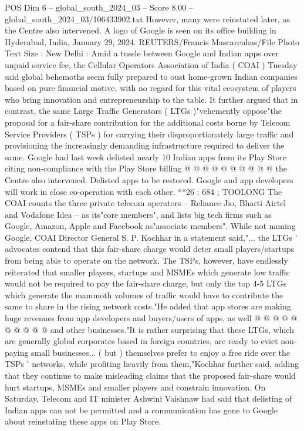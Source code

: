 \begin{textsample}{POS Dim 6 – global\_south\_2024\_03 – Score 8.00 – global\_south\_2024\_03/106433902.txt}
However, many were reinstated later, as the Centre also intervened.
A logo of Google is seen on its office building in Hyderabad, India, January 29, 2024.
REUTERS/Francis Mascarenhas/File Photo Text Size : New Delhi : Amid a tussle between Google and Indian apps over unpaid service fee, the Cellular Operators Association of India ( COAI ) Tuesday said global behemoths seem fully prepared to oust home-grown Indian companies based on pure financial motive, with no regard for this vital ecosystem of players who bring innovation and entrepreneurship to the table.
It further argued that in contrast, the same Large Traffic Generators ( LTGs )"vehemently oppose"the proposal for a fair-share contribution for the additional costs borne by Telecom Service Providers ( TSPs ) for carrying their disproportionately large traffic and provisioning the increasingly demanding infrastructure required to deliver the same.
Google had last week delisted nearly 10 Indian apps from its Play Store citing non-compliance with the Play Store billing @ @ @ @ @ @ @ @ @ @ the Centre also intervened.
Delisted apps to be restored.
Google and app developers will work in close co-operation with each other. **26 ; 684 ; TOOLONG The COAI counts the three private telecom operators -- Reliance Jio, Bharti Airtel and Vodafone Idea -- as its"core members", and lists big tech firms such as Google, Amazon, Apple and Facebook as"associate members".
While not naming Google, COAI Director General S.
P.
Kochhar in a statement said,"... the LTGs ' advocates contend that this fair-share charge would deter small players/startups from being able to operate on the network.
The TSPs, however, have endlessly reiterated that smaller players, startups and MSMEs which generate low traffic would not be required to pay the fair-share charge, but only the top 4-5 LTGs which generate the mammoth volumes of traffic would have to contribute the same to share in the rising network costs."He added that app stores are making huge revenues from app developers and buyers/users of apps, as well @ @ @ @ @ @ @ @ @ @ and other businesses."It is rather surprising that these LTGs, which are generally global corporates based in foreign countries, are ready to evict non-paying small businesses... ( but ) themselves prefer to enjoy a free ride over the TSPs ' networks, while profiting heavily from them,"Kochhar further said, adding that they continue to make misleading claims that the proposed fair-share would hurt startups, MSMEs and smaller players and constrain innovation.
On Saturday, Telecom and IT minister Ashwini Vaishnaw had said that delisting of Indian apps can not be permitted and a communication has gone to Google about reinstating these apps on Play Store.

\end{textsample}
